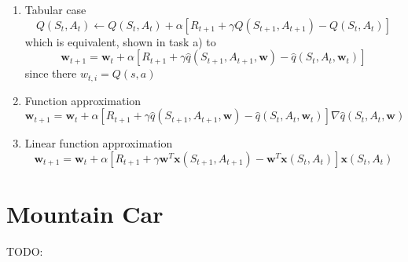 \documentclass{article}
\newcommand{\wb}{\mathbf{w}}
\newcommand{\xb}{\mathbf{x}}
\begin{document}
\begin{enumerate}
\item Tabular case
    $$Q(S_t, A_t) \leftarrow Q(S_t, A_t) + \alpha[R_{t+1} + \gamma Q(S_{t+1}, A_{t+1})- Q(S_t, A_t)]$$
    which is equivalent, shown in task a) to
    $$\mathbf{w}_{t+1} = \mathbf{w}_t + \alpha[R_{t+1} + \gamma \hat{q}(S_{t+1},A_{t+1},\mathbf{w})- \hat{q}(S_t, A_t, \wb_t)]$$
    since there $w_{t,i} = Q(s, a)$
\item Function approximation
$$\mathbf{w}_{t+1} = \mathbf{w}_t + \alpha[R_{t+1} + \gamma \hat{q}(S_{t+1},A_{t+1},\mathbf{w})- \hat{q}(S_t, A_t, \wb_t)]\nabla \hat{q}(S_t, A_t, \wb)$$
\item Linear function approximation
$$\mathbf{w}_{t+1} = \mathbf{w}_t + \alpha[R_{t+1} + \gamma \wb^T \xb(S_{t+1},A_{t+1})- \wb^T \xb(S_t, A_t)] \xb(S_{t}, A_t)$$


\end{enumerate}



\section{Mountain Car}

\begin{comment}
\begin{figure}[H]
\centering
\texttt{[image: images/terminal.png]}
\caption{Output for Trees with \texttt{maxiter} = [10, 20, 50, 100, 200, 500]}
\label{fig:terminal}
\end{figure}
\end{comment}
TODO:
\end{document}
